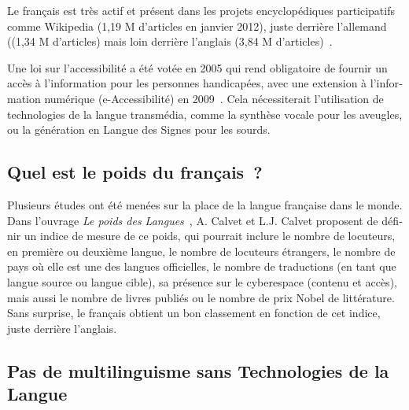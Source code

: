 \begin{french}
\begin{multicols}{2}
Le français est très actif et présent dans les projets encyclopédiques participatifs comme Wikipedia (1,19 M d'articles en janvier 2012), juste derrière l'allemand ((1,34 M d'articles) mais loin derrière l'anglais (3,84 M d'articles)~\cite{wikipediastats}.

Une loi sur l'accessibilité a été votée en 2005 qui rend
obligatoire de fournir un accès à l'information pour les
personnes handicapées, avec une extension à l'information
numérique (e-Accessibilité) en 2009~\cite{loi}. Cela nécessiterait
l'utilisation de technologies de la langue transmédia, comme
la synthèse vocale pour les aveugles, ou la génération en Langue des
Signes pour les sourds.

\subsection{Quel est le poids du français~?}

Plusieurs études ont été menées sur la place de la langue française
dans le monde. Dans l'ouvrage {\em Le poids des
  Langues}~\cite{calvet09}, A. Calvet et L.J. Calvet proposent de
définir un indice de mesure de ce poids, qui pourrait inclure le
nombre de locuteurs, en première ou deuxième langue, le nombre de
locuteurs étrangers, le nombre de pays où elle est une des langues
officielles, le nombre de traductions (en tant que langue source ou
langue cible), sa présence sur le cyberespace (contenu et accès), mais
aussi le nombre de livres publiés ou le nombre de prix Nobel de
littérature. Sans surprise, le français obtient un bon classement en
fonction de cet indice, juste derrière l'anglais.

\subsection{Pas de multilinguisme sans Technologies de la Langue}


\end{multicols}
\end{french}
